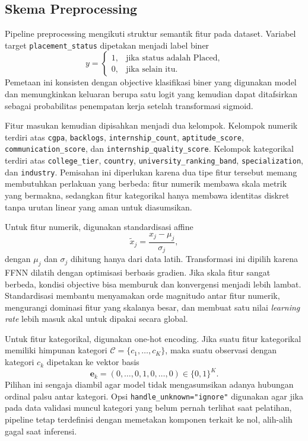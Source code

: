 \documentclass{article}
\begin{document}
\subsection{Skema Preprocessing}
\label{subsec:preprocess-eval}
Pipeline preprocessing mengikuti struktur semantik fitur pada dataset. Variabel target \texttt{placement\_status} dipetakan menjadi label biner
\begin{equation}
y=
\begin{cases}
1, & \text{jika status adalah Placed},\\
0, & \text{jika selain itu}.
\end{cases}
\end{equation}
Pemetaan ini konsisten dengan objective klasifikasi biner yang digunakan model dan memungkinkan keluaran berupa satu logit yang kemudian dapat ditafsirkan sebagai probabilitas penempatan kerja setelah transformasi sigmoid.

Fitur masukan kemudian dipisahkan menjadi dua kelompok. Kelompok numerik terdiri atas \texttt{cgpa}, \texttt{backlogs}, \texttt{internship\_count}, \texttt{aptitude\_score}, \texttt{communication\_score}, dan \texttt{internship\_quality\_score}. Kelompok kategorikal terdiri atas \texttt{college\_tier}, \texttt{country}, \texttt{university\_ranking\_band}, \texttt{specialization}, dan \texttt{industry}. Pemisahan ini diperlukan karena dua tipe fitur tersebut memang membutuhkan perlakuan yang berbeda: fitur numerik membawa skala metrik yang bermakna, sedangkan fitur kategorikal hanya membawa identitas diskret tanpa urutan linear yang aman untuk diasumsikan.

Untuk fitur numerik, digunakan standardisasi affine
\begin{equation}
\tilde{x}_j=\frac{x_j-\mu_j}{\sigma_j},
\end{equation}
dengan $\mu_j$ dan $\sigma_j$ dihitung hanya dari data latih. Transformasi ini dipilih karena FFNN dilatih dengan optimisasi berbasis gradien. Jika skala fitur sangat berbeda, kondisi objective bisa memburuk dan konvergensi menjadi lebih lambat. Standardisasi membantu menyamakan orde magnitudo antar fitur numerik, mengurangi dominasi fitur yang skalanya besar, dan membuat satu nilai \textit{learning rate} lebih masuk akal untuk dipakai secara global.

Untuk fitur kategorikal, digunakan one-hot encoding. Jika suatu fitur kategorikal memiliki himpunan kategori $\mathcal{C}=\{c_1,\ldots,c_K\}$, maka suatu observasi dengan kategori $c_k$ dipetakan ke vektor basis
\begin{equation}
\mathbf{e}_k=(0,\ldots,0,1,0,\ldots,0)\in\{0,1\}^K.
\end{equation}
Pilihan ini sengaja diambil agar model tidak mengasumsikan adanya hubungan ordinal palsu antar kategori. Opsi \texttt{handle\_unknown="ignore"} digunakan agar jika pada data validasi muncul kategori yang belum pernah terlihat saat pelatihan, pipeline tetap terdefinisi dengan memetakan komponen terkait ke nol, alih-alih gagal saat inferensi.
\end{document}
